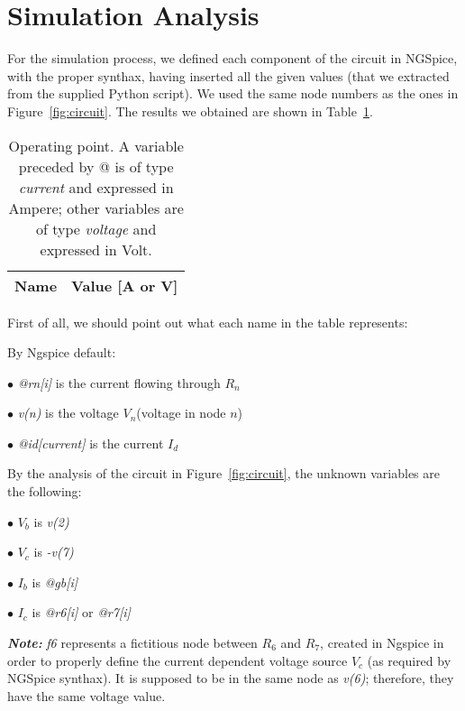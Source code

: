 \section{Simulation Analysis}
\label{sec:simulation}
For the simulation process, we defined each component of the circuit in NGSpice, with the proper synthax, having inserted all the given values (that we extracted from the supplied Python script). We used the same node numbers as the ones in Figure~\ref{fig:circuit}. The results we obtained are shown in Table~\ref{tab:op}.

\begin{table}[h]
  \centering
  \begin{tabular}{|l|r|}
    \hline    
    {\bf Name} & {\bf Value [A or V]} \\ \hline
    
  \end{tabular}
  \caption{Operating point. A variable preceded by @ is of type {\em current}
		and expressed in Ampere; other variables are of type {\it voltage} and expressed in
		Volt.}
  \label{tab:op}
\end{table}

First of all, we should point out what each name in the table represents:
\vspace{0.2cm}

By Ngspice default:

$\bullet$ \textit{@rn[i]} is the current flowing through $R_n$

$\bullet$ \textit{v(n)} is the voltage $V_n$(voltage in node $n$)

$\bullet$ \textit{@id[current]} is the current $I_d$
\vspace{.2cm}

By the analysis of the circuit in Figure~\ref{fig:circuit}, the unknown variables are the following:

$\bullet$ $V_b$ is \textit{v(2)}

$\bullet$ $V_c$ is \textit{-v(7)}

$\bullet$ $I_b$ is \textit{@gb[i]} 

$\bullet$ $I_c$ is \textit{@r6[i]} or \textit{@r7[i]}
\vspace{.2cm}

\textbf{\textit{Note:}} \textit{f6} represents a fictitious node between $R_6$ and $R_7$, created in Ngspice in order to properly define the current dependent voltage source $V_c$ (as required by NGSpice synthax). It is supposed to be in the same node as \textit{v(6)}; therefore, they have the same voltage value.
\vspace{.5cm}

